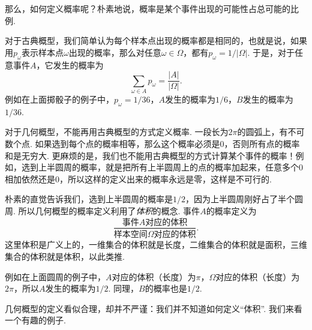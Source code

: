 那么，如何定义概率呢？朴素地说，概率是某个事件出现的可能性占总可能的比例. 

对于古典概型，我们简单认为每个样本点出现的概率都是相同的，也就是说，如果用$p_\omega$表示样本点$\omega$出现的概率，那么对任意$\omega\in\Omega$，都有$p_\omega = 1/|\Omega|$. 于是，对于任意事件$A$，它发生的概率为
\[
    \sum_{\omega\in A} p_\omega = \frac{|A|}{|\Omega|}.
\]
例如在上面掷骰子的例子中，$p_\omega=1/36$，$A$发生的概率为$1/6$，$B$发生的概率为$1/36$.

对于几何概型，不能再用古典概型的方式定义概率. 一段长为$2\pi$的圆弧上，有不可数个点. 如果选到每个点的概率相等，那么这个概率必须是$0$，否则所有点的概率和是无穷大. 更麻烦的是，我们也不能用古典概型的方式计算某个事件的概率！例如，选到上半圆周的概率，就是把所有上半圆周上的点的概率加起来，任意多个$0$相加依然还是$0$，所以这样的定义出来的概率永远是零，这样是不可行的. 

朴素的直觉告诉我们，选到上半圆周的概率是$1/2$，因为上半圆周刚好占了半个圆周. 所以几何概型的概率定义利用了\emph{体积}的概念. 事件$A$的概率定义为
\[
    \frac{\text{事件$A$对应的体积}}{\text{样本空间$\Omega$对应的体积}}.
\]
这里体积是广义上的，一维集合的体积就是长度，二维集合的体积就是面积，三维集合的体积就是体积，以此类推. 

例如在上面圆周的例子中，$A$对应的体积（长度）为$\pi$，$\Omega$对应的体积（长度）为$2\pi$，所以$A$发生的概率为$1/2$. 同理，$B$的概率也是$1/2$.

几何概型的定义看似合理，却并不严谨：我们并不知道如何定义“体积”. 我们来看一个有趣的例子. 

